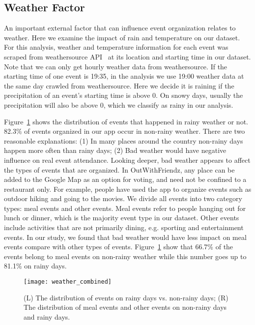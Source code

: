 \iffalse
The general gender distribution is reasonable because many users 
we hired from Microworkers or Craigslist are housewives who have time to make small
money. They created invitations regularly to have coffee or go shopping with their friends using
our App, which makes female ratio higher than male.
\fi

\subsection{Weather Factor}
An important external factor that can influence event organization relates to weather. Here we 
examine the impact of rain and temperature on our dataset. For this analysis, weather and
temperature information for each event was scraped from weathersource 
API~\cite{weathersource} at its location and starting time in our dataset. Note that we can only 
get hourly weather data from weathersource. If the starting time of one event is 19:35, in the 
analysis we use 19:00 weather data at the same day crawled from weathersource. Here we 
decide it is raining if the precipitation of an event's starting time is above 0. On snowy days, usually 
the precipitation will also be above 0, which we classify as rainy in our analysis.

Figure~\ref{fig:weather} shows the distribution of events that happened in 
rainy weather or not. 82.3\% of events organized in our app
occur in non-rainy weather. There are two reasonable explanations:
(1) In many places around the country non-rainy days happen more often than rainy
days; (2) Bad weather would have negative influence on real event attendance.
Looking deeper, bad weather appears to affect the types of events that are organized.
In OutWithFriendz, any place can be added to the Google Map as an option for voting, and need 
not be confined to a restaurant only.  For example, people have used the app to organize events such
as outdoor hiking and going to the movies.  We divide all events into two category types: 
meal events and other events. Meal events refer to people hanging out for lunch or
dinner, which is the majority event type in our dataset.  Other events include activities
that are not primarily dining, e.g. sporting and entertainment events.  In our study, we found 
that bad weather would have less impact on meal events compare with other types of events.
Figure~\ref{fig:weather} show that 66.7\% of the events belong to meal events on non-rainy 
weather while this number goes up to 81.1\% on rainy days.

\begin{figure}
\centering
\texttt{[image: weather\_combined]}

\caption{(L) The distribution of events on rainy days vs. non-rainy days; (R) The 
distribution of meal events and other events on non-rainy days and rainy days.}
\label{fig:weather}
\end{figure}

